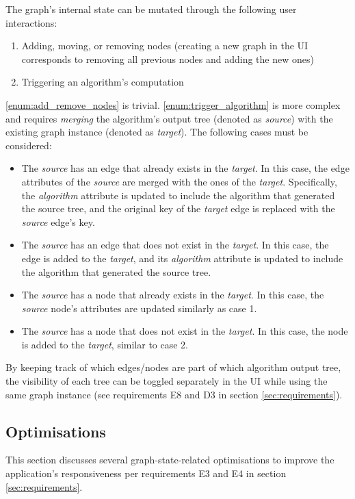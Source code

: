\documentclass{l4proj}
\begin{document}
The graph's internal state can be mutated through the following user interactions:
\begin{enumerate}
    \item \label{enum:add_remove_nodes} Adding, moving, or removing nodes (creating a new graph in the UI corresponds to removing all previous nodes and adding the new ones)
    \item \label{enum:trigger_algorithm} Triggering an algorithm's computation
\end{enumerate}
\ref{enum:add_remove_nodes} is trivial.
\ref{enum:trigger_algorithm} is more complex and requires \textit{merging} the algorithm's output tree (denoted as \textit{source}) with the existing graph instance (denoted as \textit{target}). The following cases must be considered:
\begin{itemize}
    \item The \textit{source} has an edge that already exists in the \textit{target}. In this case, the edge attributes of the \textit{source} are merged with the ones of the \textit{target}. Specifically, the \textit{algorithm} attribute is updated to include the algorithm that generated the source tree, and the original key of the \textit{target} edge is replaced with the \textit{source} edge's key.
    \item The \textit{source} has an edge that does not exist in the \textit{target}. In this case, the edge is added to the \textit{target}, and its \textit{algorithm} attribute is updated to include the algorithm that generated the source tree.
    \item The \textit{source} has a node that already exists in the \textit{target}. In this case, the \textit{source} node's attributes are updated similarly as case 1.
    \item The \textit{source} has a node that does not exist in the \textit{target}. In this case, the node is added to the \textit{target}, similar to case 2.
\end{itemize}

By keeping track of which edges/nodes are part of which algorithm output tree, the visibility of each tree can be toggled separately in the UI while using the same graph instance (see requirements E8 and D3 in section \ref{sec:requirements}).

\subsection{Optimisations}
This section discusses several graph-state-related optimisations to improve the application's responsiveness per requirements E3 and E4 in section \ref{sec:requirements}.
\end{document}
